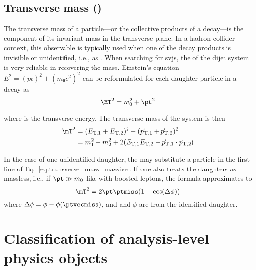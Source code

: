 

\subsection{Transverse mass (\texorpdfstring{\mT}{MT})}
\label{subsec:objects_transverse_mass}

The transverse mass \mT of a particle---or the collective products of a decay---is the component of its invariant mass in the transverse plane. In a hadron collider context, this observable is typically used when one of the decay products is invisible or unidentified, i.e., as \ptvecmiss. When searching for \glspl{svj}, the \mT of the dijet system is very reliable in recovering the \PZprime mass. Einstein's equation $E^2 = (pc)^2 + (m_0c^2)^2$ can be reformulated for each daughter particle in a decay as
\begin{equation}
\ET^2 = m_0^2 + \pt^2
\label{eq:transverse_energy}
\end{equation}

where \ET is the transverse energy. The transverse mass of the system is then
\begin{equation}
    \begin{aligned}
\mT^2 &= (E_{\mathrm{T,1}} + E_{\mathrm{T,2}})^2 - ({\vec p}_{\mathrm{T,1}} + {\vec p}_{\mathrm{T,2}})^2 \\
&= m_1^2 + m_2^2 + 2(E_{\mathrm{T,1}} E_{\mathrm{T,2}} - {\vec p}_{\mathrm{T,1}} \cdot {\vec p}_{\mathrm{T,2}})
    \end{aligned}
\label{eq:transverse_mass_massive}
\end{equation}

In the case of one unidentified daughter, the \ptvecmiss may substitute a particle in the first line of Eq.~\ref{eq:transverse_mass_massive}. If one also treats the daughters as massless, i.e., if $\pt \gg m_0$ like with boosted leptons, the formula approximates to
\begin{equation}
\mT^2 = 2 \pt \ptmiss (1 - \cos(\Delta\phi))
\label{eq:transverse_mass_massless}
\end{equation}
where $\Delta\phi = \phi - \phi(\ptvecmiss)$, and \pt and $\phi$ are from the identified daughter.




\section{Classification of analysis-level physics objects}
\label{sec:analysis_objects}

